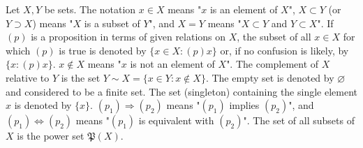 Let $X, Y$ be sets. The notation $x \in X$ means "$x$ is an element of $X$", $X \subset Y$ (or $Y \supset X$) means "$X$ is a subset of $Y$", and $X = Y$ means "$X \subset Y$ and $Y \subset X$". If $(p)$ is a proposition in terms of given relations on $X$, the subset of all $x \in X$ for which $(p)$ is true is denoted by $\{x \in X: (p)x\}$ or, if no confusion is likely, by $\{x: (p)x\}$. $x \notin X$ means "$x$ is not an element of $X$". The complement of $X$ relative to $Y$ is the set $Y \sim X = \{x \in Y: x \notin X\}$. The empty set is denoted by $\varnothing$ and considered to be a finite set. The set (singleton) containing the single element $x$ is denoted by $\{x\}$. $(p_1) \Rightarrow (p_2)$ means "$(p_1)$ implies $(p_2)$", and $(p_1) \Leftrightarrow (p_2)$ means "$(p_1)$ is equivalent with $(p_2)$". The set of all subsets of $X$ is the power set $\mathfrak{P}(X)$.
